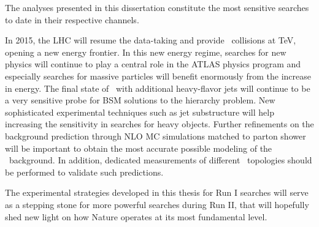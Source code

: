 The analyses presented in this dissertation constitute the most sensitive searches to date in their respective channels.

In 2015, the LHC will resume the data-taking and provide \pp\ collisions at \unit[13]{\TeV}, opening a new energy frontier. In this new energy regime, searches for new physics will continue to play a central role in the ATLAS physics program and especially searches for massive particles will benefit enormously from the increase in energy. 
The final state of \ttbar\ with additional heavy-flavor jets will continue to be a very sensitive probe for BSM solutions to the hierarchy problem. New sophisticated experimental techniques such as jet substructure will help increasing the sensitivity in searches for heavy objects.
Further refinements on the background prediction through NLO MC simulations matched to parton shower will be important to obtain the most accurate possible modeling of the \ttHF\ background. In addition, dedicated measurements of different \ttHF\ topologies should be performed to validate such predictions.

The experimental strategies developed in this thesis for Run I searches will serve as a stepping stone for more powerful searches during Run II, that will hopefully shed new light on how Nature operates at its most fundamental level.

